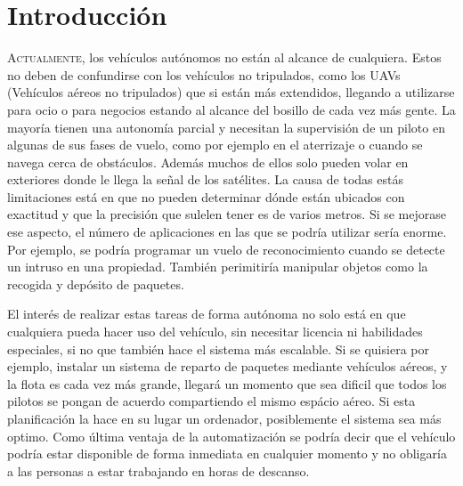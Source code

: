 \chapter{Introducción}\label{chp-02}



\lettrine[lraise=-0.1, lines=2, loversize=0.2]{A}{ctualmente}, los vehículos autónomos no están al alcance de cualquiera. Estos no deben de confundirse con los vehículos no tripulados, como los UAVs (Vehículos aéreos no tripulados) que si están más extendidos, llegando a utilizarse para ocio o para negocios estando al alcance del bosillo de cada vez más gente. La mayoría tienen una autonomía parcial y necesitan la supervisión de un piloto en algunas de sus fases de vuelo, como por ejemplo en el aterrizaje o cuando se navega cerca de obstáculos. Además muchos de ellos solo pueden volar en exteriores donde le llega la señal de los satélites. 
La causa de todas estás limitaciones está en que no pueden determinar dónde están ubicados con exactitud y que la precisión que sulelen tener es de varios metros. Si se mejorase ese aspecto, el número de aplicaciones en las que se podría utilizar sería enorme. 
Por ejemplo, se podría programar un vuelo de reconocimiento cuando se detecte un intruso en una propiedad. También perimitiría manipular objetos como la recogida y depósito de paquetes.  

El interés de realizar estas tareas de forma autónoma no solo está en que cualquiera pueda hacer uso del vehículo, sin necesitar licencia ni habilidades especiales, si no que también hace el sistema más escalable. Si se quisiera por ejemplo, instalar un sistema de reparto de paquetes mediante vehículos aéreos, y la flota es cada vez más grande, llegará un momento que sea dificil que todos los pilotos se pongan de acuerdo compartiendo el mismo espácio aéreo. Si esta planificación la hace en su lugar un ordenador, posiblemente el sistema sea más optimo. Como última ventaja de la automatización se podría decir que el vehículo podría estar disponible de forma inmediata en cualquier momento y no obligaría a las personas a estar trabajando en horas de descanso. 

